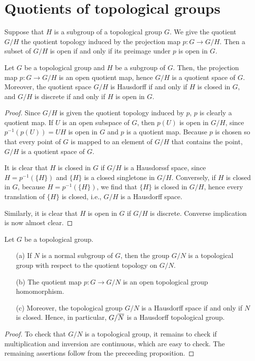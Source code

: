 \section{Quotients of topological groups}

Suppose that $H$ is a subgroup of a topological group $G$.
We give the quotient $G/H$ the quotient topology induced by the projection map $p: G\rightarrow G/H$.
Then a subset of $G/H$ is open if and only if its preimage under $p$ is open in $G$.
\begin{prop}
    Let $G$ be a topological group and $H$ be a subgroup of $G$.
    Then, the projection map $p: G\rightarrow G/H$ is an open quotient map, hence $G/H$ is a quotient space of $G$.
    Moreover, the quotient space $G/H$ is Hausdorff if and only if $H$ is closed in $G$, and $G/H$ is discrete if and only if $H$ is open in $G$.
\end{prop}
\begin{proof}
    Since $G/H$ is given the quotient topology induced by $p$, $p$ is clearly a quotient map.
    If $U$ is an open subspace of $G$, then $p(U)$ is open in $G/H$, since $p^{-1}(p(U))=UH$ is open in $G$ and $p$ is a quotient map.
    Because $p$ is chosen so that every point of $G$ is mapped to an element of $G/H$ that contains the point, $G/H$ is a quotient space of $G$.

    It is clear that $H$ is closed in $G$ if $G/H$ is a Hausdorssf space, since $H=p^{-1}(\{H\})$ and $\{H\}$ is a closed singletone in $G/H$.
    Conversely, if $H$ is closed in $G$, because $H=p^{-1}(\{H\})$, we find that $\{H\}$ is closed in $G/H$, hence every translation of $\{H\}$ is closed, i.e., $G/H$ is a Hausdorff space.

    Similarly, it is clear that $H$ is open in $G$ if $G/H$ is discrete.
    Converse implication is now almost clear.
\end{proof}

\begin{thm}
    Let $G$ be a topological group.
    \begin{enumerate}
        \item[(a)]
        {
            If $N$ is a normal subgroup of $G$, then the group $G/N$ is a topological group with respect to the quotient topology on $G/N$.
        }
        \item[(b)]
        {
            The quotient map $p: G\rightarrow G/N$ is an open topological group homomorphism.
        }
        \item[(c)]
        {
            Moreover, the topological group $G/N$ is a Hausdorff space if and only if $N$ is closed.
            Hence, in particular, $G/\overline{N}$ is a Hausdorff topological group.
        }
    \end{enumerate}
\end{thm}
\begin{proof}
    To check that $G/N$ is a topological group, it remains to check if multiplication and inversion are continuous, which are easy to check.
    The remaining assertions follow from the preceeding proposition.
\end{proof}

